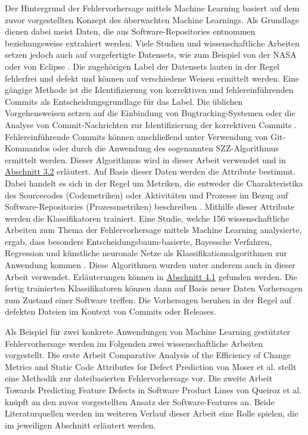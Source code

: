 Der Hintergrund der Fehlervorhersage mittels Machine Learning basiert auf dem zuvor vorgestellten Konzept des überwachten Machine Learnings. Als Grundlage dienen dabei meist Daten, die aus Software-Repositories entnommen beziehungsweise extrahiert werden. Viele Studien und wissenschaftliche Arbeiten setzen jedoch auch auf vorgefertigte Datensets, wie zum Beispiel von der NASA oder von Eclipse \cite{Son2019}. Die zugehörigen Label der Datensets lauten in der Regel \glqq fehlerfrei\grqq{} und \glqq defekt\grqq{} und können auf verschiedene Weisen ermittelt werden. Eine gängige Methode ist die Identifizierung von korrektiven und fehlereinführenden Commits als Entscheidungsgrundlage für das Label. Die üblichen Vorgehensweisen setzen auf die Einbindung von Bugtracking-Systemen oder die Analyse von Commit-Nachrichten zur Identifizierung der korrektiven Commits \cite{Queiroz2016,Zimmermann2007}. Fehlereinführende Commits können anschließend unter Verwendung von Git-Kommandos oder durch die Anwendung des sogenannten SZZ-Algorithmus ermittelt werden. Dieser Algorithmus wird in dieser Arbeit verwendet und in \hyperref[szz-def]{Abschnitt 3.2} erläutert. Auf Basis dieser Daten werden die Attribute bestimmt. Dabei handelt es sich in der Regel um Metriken, die entweder die Charakteristika des Sourcecodes (Codemetriken) oder Aktivitäten und Prozesse im Bezug auf Software-Repositories (Prozessmetriken) beschreiben \cite{Son2019,Rahman2013}. Mithilfe dieser Attribute werden die Klassifikatoren trainiert. Eine Studie, welche 156 wissenschaftliche Arbeiten zum Thema der Fehlervorhersage mittels Machine Learning analysierte, ergab, dass besonders Entscheidungsbaum-basierte, Bayessche Verfahren, Regression und künstliche neuronale Netze als Klassifikationsalgorithmen zur Anwendung kommen \cite{Son2019}. Diese Algorithmen wurden unter anderem auch in dieser Arbeit verwendet. Erläuterungen können in \hyperref[algorithms]{Abschnitt 4.1} gefunden werden. Die fertig trainierten Klassifikatoren können dann auf Basis neuer Daten Vorhersagen zum Zustand einer Software treffen. Die Vorhersagen beruhen in der Regel auf defekten Dateien im Kontext von Commits oder Releases.

Als Beispiel für zwei konkrete Anwendungen von Machine Learning gestützter Fehlervorhersage werden im Folgenden zwei wissenschaftliche Arbeiten vorgestellt. Die erste Arbeit \glqq Comparative Analysis of the Efficiency of Change Metrics and Static Code Attributes for Defect Prediction\grqq{} von Moser et al. \cite{Moser2008} stellt eine Methodik zur dateibasierten Fehlervorhersage vor. Die zweite Arbeit \glqq Towards Predicting Feature Defects in Software Product Lines\grqq{} von Queiroz et al. \cite{Queiroz2016} knüpft an den zuvor vorgestellten Ansatz der Software-Features an. Beide Literaturquellen werden im weiteren Verlauf dieser Arbeit eine Rolle spielen, die im jeweiligen Abschnitt erläutert werden.

